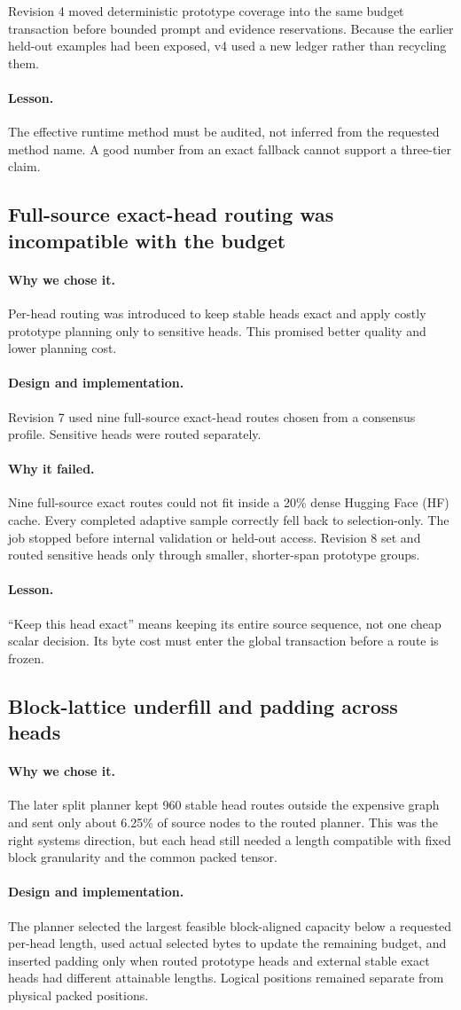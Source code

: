 \documentclass[11pt]{article}
\newcommand{\code}[1]{\texttt{\detokenize{#1}}}
\newcommand{\lesson}{\paragraph{Lesson.}}
\newcommand{\reason}{\paragraph{Why we chose it.}}
\newcommand{\design}{\paragraph{Design and implementation.}}
\newcommand{\failure}{\paragraph{Why it failed.}}
\begin{document}
Revision 4 moved deterministic prototype coverage into the same budget transaction before bounded
prompt and evidence reservations.  Because the earlier held-out examples had been exposed, v4
used a new ledger rather than recycling them.

\lesson
The effective runtime method must be audited, not inferred from the requested method name.  A good
number from an exact fallback cannot support a three-tier claim.

\subsection{Full-source exact-head routing was incompatible with the budget}

\reason
Per-head routing was introduced to keep stable heads exact and apply costly prototype planning only
to sensitive heads.  This promised better quality and lower planning cost.

\design
Revision 7 used nine full-source exact-head routes chosen from a consensus profile.  Sensitive
heads were routed separately.

\failure
Nine full-source exact routes could not fit inside a 20\% dense Hugging Face (HF) cache.  Every
completed adaptive sample correctly fell back to selection-only.  The job stopped before internal
validation or held-out access.  Revision 8 set \code{exact_head_fraction: 0} and routed sensitive
heads only through smaller, shorter-span prototype groups.

\lesson
``Keep this head exact'' means keeping its entire source sequence, not one cheap scalar decision.
Its byte cost must enter the global transaction before a route is frozen.

\subsection{Block-lattice underfill and padding across heads}

\reason
The later split planner kept 960 stable head routes outside the expensive graph and sent only about
6.25\% of source nodes to the routed planner.  This was the right systems direction, but each head
still needed a length compatible with fixed block granularity and the common packed tensor.

\design
The planner selected the largest feasible block-aligned capacity below a requested per-head length,
used actual selected bytes to update the remaining budget, and inserted padding only when routed
prototype heads and external stable exact heads had different attainable lengths.  Logical
positions remained separate from physical packed positions.
\end{document}
